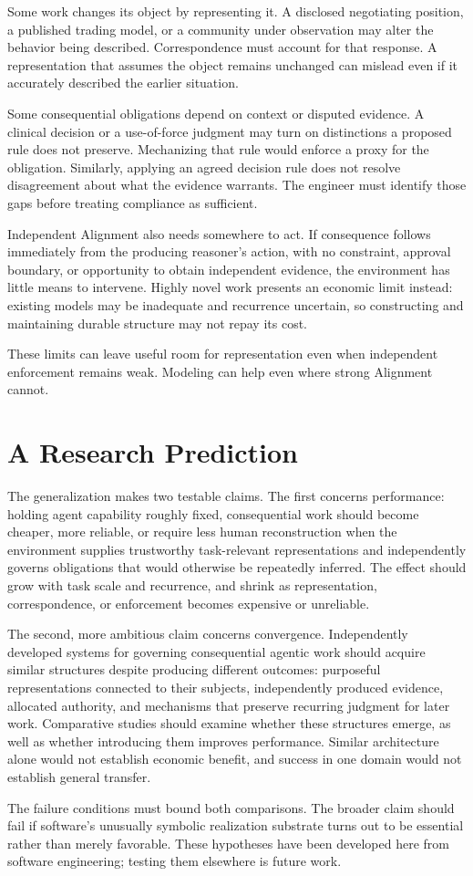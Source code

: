 Some work changes its object by representing it. A disclosed negotiating position, a published trading model, or a community under observation may alter the behavior being described. Correspondence must account for that response. A representation that assumes the object remains unchanged can mislead even if it accurately described the earlier situation.

Some consequential obligations depend on context or disputed evidence. A clinical decision or a use-of-force judgment may turn on distinctions a proposed rule does not preserve. Mechanizing that rule would enforce a proxy for the obligation. Similarly, applying an agreed decision rule does not resolve disagreement about what the evidence warrants. The engineer must identify those gaps before treating compliance as sufficient.

Independent Alignment also needs somewhere to act. If consequence follows immediately from the producing reasoner's action, with no constraint, approval boundary, or opportunity to obtain independent evidence, the environment has little means to intervene. Highly novel work presents an economic limit instead: existing models may be inadequate and recurrence uncertain, so constructing and maintaining durable structure may not repay its cost.

These limits can leave useful room for representation even when independent enforcement remains weak. Modeling can help even where strong Alignment cannot.

\section{A Research Prediction}\label{heading:a-research-prediction}

The generalization makes two testable claims. The first concerns performance: holding agent capability roughly fixed, consequential work should become cheaper, more reliable, or require less human reconstruction when the environment supplies trustworthy task-relevant representations and independently governs obligations that would otherwise be repeatedly inferred. The effect should grow with task scale and recurrence, and shrink as representation, correspondence, or enforcement becomes expensive or unreliable.

The second, more ambitious claim concerns convergence. Independently developed systems for governing consequential agentic work should acquire similar structures despite producing different outcomes: purposeful representations connected to their subjects, independently produced evidence, allocated authority, and mechanisms that preserve recurring judgment for later work. Comparative studies should examine whether these structures emerge, as well as whether introducing them improves performance. Similar architecture alone would not establish economic benefit, and success in one domain would not establish general transfer.

The failure conditions must bound both comparisons. The broader claim should fail if software's unusually symbolic realization substrate turns out to be essential rather than merely favorable. These hypotheses have been developed here from software engineering; testing them elsewhere is future work.
